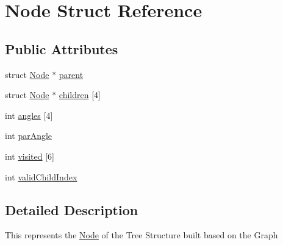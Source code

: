 \hypertarget{struct_node}{
\section{Node Struct Reference}
\label{struct_node}
}
\subsection*{Public Attributes}
\begin{DoxyCompactItemize}
\item 
struct \hyperlink{struct_node}{Node} $\ast$ \hyperlink{struct_node_a34f3ab9670c7b70dad8905359a243c92}{parent}
\item 
struct \hyperlink{struct_node}{Node} $\ast$ \hyperlink{struct_node_aa580e214047863941be220659fab2bc6}{children} \mbox{[}4\mbox{]}
\item 
int \hyperlink{struct_node_ac5a8aacfe227928bca29c6d4f0eee7da}{angles} \mbox{[}4\mbox{]}
\item 
int \hyperlink{struct_node_abea6b2e2a8f028c630305ff20eff3ad9}{parAngle}
\item 
int \hyperlink{struct_node_a977a4af32ecfaab42197c992629c9f0d}{visited} \mbox{[}6\mbox{]}
\item 
int \hyperlink{struct_node_ad173711c9173521a74985ec03b9b93e0}{validChildIndex}
\end{DoxyCompactItemize}


\subsection{Detailed Description}
This represents the \hyperlink{struct_node}{Node} of the Tree Structure built based on the Graph 

